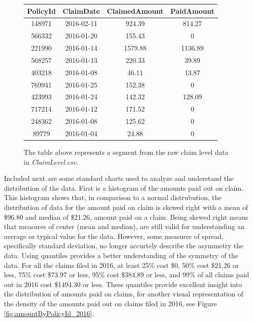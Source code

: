 \documentclass[12pt,letterpaper,titlepage]{article}
\begin{document}
			\begin{figure}[!ht]
				\centering
				\begin{tabular}{|c|c|c|c|}
					\hline
					PolicyId & ClaimDate & ClaimedAmount & PaidAmount \\
					\hline
					148971	& 2016-02-11	& 924.39	& 814.27 \\
					566332	& 2016-01-20	& 155.43	& 0 \\
					221990	& 2016-01-14	& 1579.88	& 1136.89 \\
					568257	& 2016-01-13	& 220.33	& 39.89 \\
					403218	& 2016-01-08	& 46.11		& 13.87 \\
					769941	& 2016-01-25	& 152.38	& 0 \\
					423993	& 2016-01-24	& 142.32	& 128.09 \\
					717214	& 2016-01-12	& 171.52	& 0 \\
					248362	& 2016-01-08	& 125.62	& 0 \\
					89779	& 2016-01-04	& 24.88		& 0 \\
					\hline
				\end{tabular}
				\caption{The table above represents a segment from the raw claim level data in \emph{ClaimLevel.csv}.} 	
				\label{tab:exampleData}
			\end{figure}	
			\FloatBarrier

			Included next are some standard charts used to analyze and understand the distribution of the data. First is a histogram of the amounts paid out on claim. This histogram shows that, in comparison to a normal distrubution, the distribution of data for the amount paid on claim is skewed right with a mean of \$96.80 and median of \$21.26, amount paid on a claim. Being skewed right means that measures of center (mean and median), are still valid for understanding an average or typical value for the data. However, some measures of spread, specifically standard deviation, no longer accurtely describe the asymmetry the data. Using quantiles provides a better understanding of the symmetry of the data. For all the claims filed in 2016, at least 25\% cost \$0,  50\% cost \$21.26 or less, 75\% cost \$73.97 or less, 95\% cost \$384.89 or less, and 99\% of all claims paid out in 2016 cost \$1494.30 or less. These quantiles provide excellent insight into the distribution of amounts paid on claims, for another visual representation of the density of the amounts paid out on claims filed in 2016, see Figure \ref{fig:amountByPolicyId_2016}.
			
\end{document}
